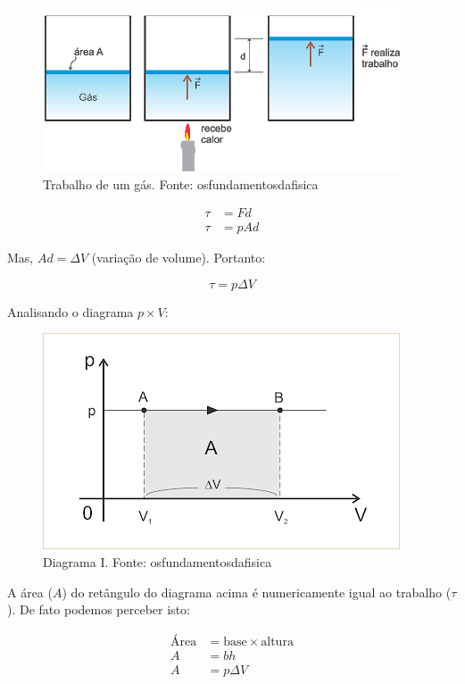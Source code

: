 \documentclass[12pt]{article}
\begin{document}
\begin{figure}[h]{}
\centering\includegraphics[width=2.5truein]{img2.png}
\caption{Trabalho de um gás. Fonte: osfundamentosdafisica}
\centering
\end{figure}

\begin{align*}
    \tau &= Fd \\
    \tau &= pAd
\end{align*}


Mas, $Ad=\Delta V$ (variação de volume). Portanto:


\begin{equation}\label{eq:trabalho}
    \tau = p\Delta V
\end{equation}


Analisando o diagrama $p\times V$:


\begin{figure}[h]{}
\centering\includegraphics[width=2.5truein]{img3.png}
\caption{Diagrama I. Fonte: osfundamentosdafisica}
\centering
\end{figure}

A área (\textbf{$A$}) do retângulo do diagrama acima é numericamente igual ao trabalho (\textbf{$\tau$}). De fato podemos perceber isto:


\begin{align*}
    \text{Área} &= \text{base} \times \text{altura} \\
    A &= bh \\
    A &= p\Delta V
\end{align*}
\end{document}
